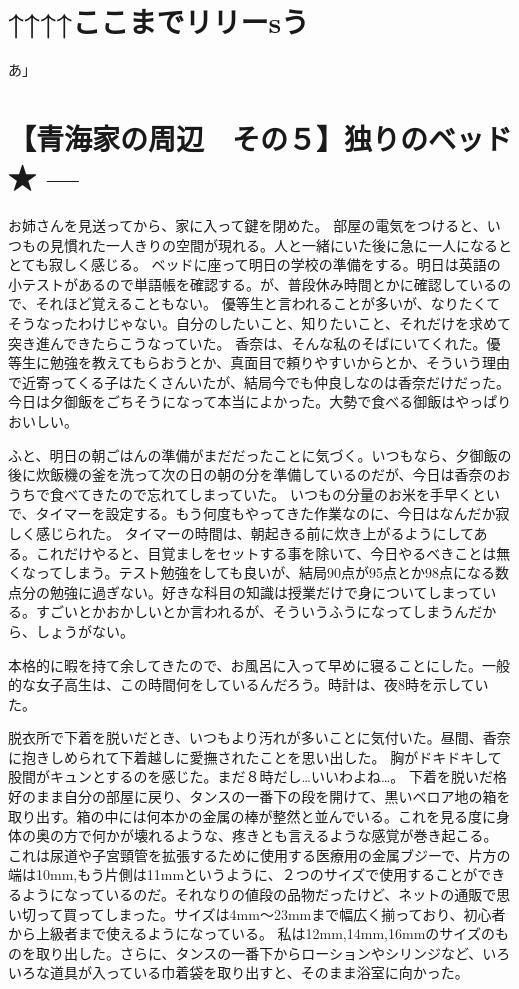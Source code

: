 \section{↑↑↑↑ここまでリリーsう}
あ」

\section{【青海家の周辺　その５】独りのベッド ★ ---}
お姉さんを見送ってから、家に入って鍵を閉めた。
部屋の電気をつけると、いつもの見慣れた一人きりの空間が現れる。人と一緒にいた後に急に一人になるととても寂しく感じる。
ベッドに座って明日の学校の準備をする。明日は英語の小テストがあるので単語帳を確認する。が、普段休み時間とかに確認しているので、それほど覚えることもない。
優等生と言われることが多いが、なりたくてそうなったわけじゃない。自分のしたいこと、知りたいこと、それだけを求めて突き進んできたらこうなっていた。
香奈は、そんな私のそばにいてくれた。優等生に勉強を教えてもらおうとか、真面目で頼りやすいからとか、そういう理由で近寄ってくる子はたくさんいたが、結局今でも仲良しなのは香奈だけだった。今日は夕御飯をごちそうになって本当によかった。大勢で食べる御飯はやっぱりおいしい。

ふと、明日の朝ごはんの準備がまだだったことに気づく。いつもなら、夕御飯の後に炊飯機の釜を洗って次の日の朝の分を準備しているのだが、今日は香奈のおうちで食べてきたので忘れてしまっていた。
いつもの分量のお米を手早くといで、タイマーを設定する。もう何度もやってきた作業なのに、今日はなんだか寂しく感じられた。
タイマーの時間は、朝起きる前に炊き上がるようにしてある。これだけやると、目覚ましをセットする事を除いて、今日やるべきことは無くなってしまう。テスト勉強をしても良いが、結局90点が95点とか98点になる数点分の勉強に過ぎない。好きな科目の知識は授業だけで身についてしまっている。すごいとかおかしいとか言われるが、そういうふうになってしまうんだから、しょうがない。

本格的に暇を持て余してきたので、お風呂に入って早めに寝ることにした。一般的な女子高生は、この時間何をしているんだろう。時計は、夜8時を示していた。

脱衣所で下着を脱いだとき、いつもより汚れが多いことに気付いた。昼間、香奈に抱きしめられて下着越しに愛撫されたことを思い出した。
胸がドキドキして股間がキュンとするのを感じた。まだ８時だし…いいわよね…。
下着を脱いだ格好のまま自分の部屋に戻り、タンスの一番下の段を開けて、黒いベロア地の箱を取り出す。箱の中には何本かの金属の棒が整然と並んでいる。これを見る度に身体の奥の方で何かが壊れるような、疼きとも言えるような感覚が巻き起こる。
これは尿道や子宮頸管を拡張するために使用する医療用の金属ブジーで、片方の端は10mm,もう片側は11mmというように、２つのサイズで使用することができるようになっているのだ。それなりの値段の品物だったけど、ネットの通販で思い切って買ってしまった。サイズは4mm～23mmまで幅広く揃っており、初心者から上級者まで使えるようになっている。
私は12mm,14mm,16mmのサイズのものを取り出した。さらに、タンスの一番下からローションやシリンジなど、いろいろな道具が入っている巾着袋を取り出すと、そのまま浴室に向かった。

